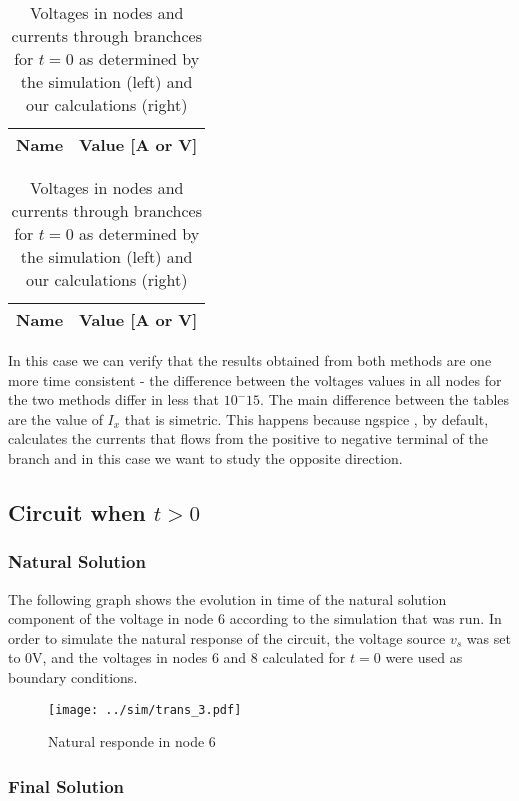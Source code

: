 \begin{table}[H]
  \centering
  \begin{tabular}{|c|c|}
    \hline    
    {\bf Name} & {\bf Value [A or V]} \\ \hline
    
  \end{tabular}
  \begin{tabular}{|c|c|}
    \hline    
    {\bf Name} & {\bf Value [A or V]} \\ \hline
    
  \end{tabular}
  \caption{Voltages in nodes and currents through branchces for $t=0$ as determined by the simulation (left) and our calculations (right)}
  \label{tab:comparison2}
\end{table}

In this case we can verify that the results obtained from both methods are one more time consistent - the difference between the voltages values in all nodes for the two methods differ in less that $10^-15$. 
The main difference between the tables are the value of $I_x$ that is simetric. This happens because ngspice , by default, calculates the currents that flows from the positive to negative terminal of the branch and in this case we want to study the opposite direction. 

\subsection{Circuit when $t>0$}

\subsubsection{Natural Solution}

The following graph shows the evolution in time of the natural solution component of the voltage in node 6 according to the simulation that was run. In order to simulate the natural response of the circuit, the voltage source $v_s$ was set to $0$V, and the voltages in nodes 6 and 8 calculated for $t=0$ were used as boundary conditions.

\begin{figure}[H] \centering
\texttt{[image: ../sim/trans\_3.pdf]}
\caption{Natural responde in node 6}
\label{fig:natural_sim}
\end{figure}

\subsubsection{Final Solution}

